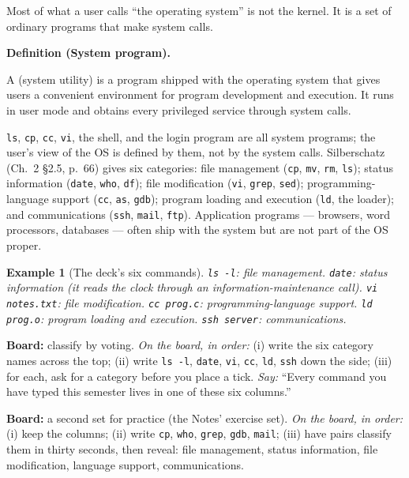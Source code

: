 \documentclass[11pt]{article}
\newtheorem{example}{Example}[section]
\newenvironment{definitionbox}[1]{%
  \par\noindent\textbf{Definition (#1).}\ \itshape
}{\par\vspace{0.3em}}
\begin{document}
Most of what a user calls ``the operating system'' is not the kernel. It is a set of ordinary programs that make system calls.

\begin{definitionbox}{System program}
A  (system utility) is a program shipped with the operating system that gives users a convenient environment for program development and execution. It runs in user mode and obtains every privileged service through system calls.
\end{definitionbox}

\texttt{ls}, \texttt{cp}, \texttt{cc}, \texttt{vi}, the shell, and the login program are all system programs; the user's view of the OS is defined by them, not by the system calls. Silberschatz (Ch.~2 \S2.5, p.~66) gives six categories: file management (\texttt{cp}, \texttt{mv}, \texttt{rm}, \texttt{ls}); status information (\texttt{date}, \texttt{who}, \texttt{df}); file modification (\texttt{vi}, \texttt{grep}, \texttt{sed}); programming-language support (\texttt{cc}, \texttt{as}, \texttt{gdb}); program loading and execution (\texttt{ld}, the loader); and communications (\texttt{ssh}, \texttt{mail}, \texttt{ftp}). Application programs --- browsers, word processors, databases --- often ship with the system but are not part of the OS proper.

\begin{example}[The deck's six commands]
\texttt{ls -l}: file management. \texttt{date}: status information (it reads the clock through an information-maintenance call). \texttt{vi notes.txt}: file modification. \texttt{cc prog.c}: programming-language support. \texttt{ld prog.o}: program loading and execution. \texttt{ssh server}: communications.
\end{example}

\textbf{Board:} classify by voting. \emph{On the board, in order:} (i) write the six category names across the top; (ii) write \texttt{ls -l}, \texttt{date}, \texttt{vi}, \texttt{cc}, \texttt{ld}, \texttt{ssh} down the side; (iii) for each, ask for a category before you place a tick. \emph{Say:} ``Every command you have typed this semester lives in one of these six columns.''

\textbf{Board:} a second set for practice (the Notes' exercise set). \emph{On the board, in order:} (i) keep the columns; (ii) write \texttt{cp}, \texttt{who}, \texttt{grep}, \texttt{gdb}, \texttt{mail}; (iii) have pairs classify them in thirty seconds, then reveal: file management, status information, file modification, language support, communications.
\end{document}
